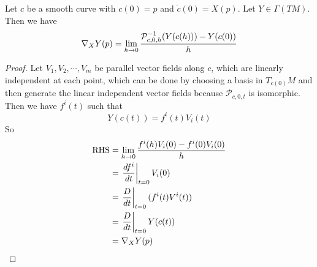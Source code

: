 \begin{prop}\label{prop:movingframe}
	Let $c$ be a smooth curve with $c(0) = p$ and $\dot{c}(0)=X(p)$. Let $Y \in \Gamma(TM)$. Then we have
	\begin{equation*}
		\nabla_{X}Y(p) = \lim_{h\rightarrow 0}\frac{\mathcal{P}_{c,0,h}^{-1}(Y(c(h))) - Y(c(0))}{h}
	\end{equation*}
\end{prop}
\begin{proof}
	Let $V_1,V_2,\cdots,V_m$ be parallel vector fields along $c$, which are linearly independent at each point, which can be done by choosing a basis in $T_{c(0)}M$ and then generate the linear independent vector fields because $\mathcal{P}_{c,0,t}$ is isomorphic. Then we have $f^i(t)$ such that
	\begin{equation*}
		Y(c(t)) = f^i(t)V_i(t)
	\end{equation*}
	So
	\begin{equation*}
		\begin{aligned}
			\text{RHS} &= \lim_{h \rightarrow 0} \frac{f^i(h)V_i(0) - f^i(0)V_i(0)}{h} \\
			&= \left.\frac{df^i}{dt}\right\lvert_{t=0}V_i(0) \\
			&= \left.\frac{D}{dt}\right\lvert_{t=0}(f^i(t)V^i(t))\\
			&= \left.\frac{D}{dt}\right\lvert_{t=0}Y(c(t)) \\
			&= \nabla_{X}Y(p)
		\end{aligned}
	\end{equation*} \qedhere
\end{proof}

